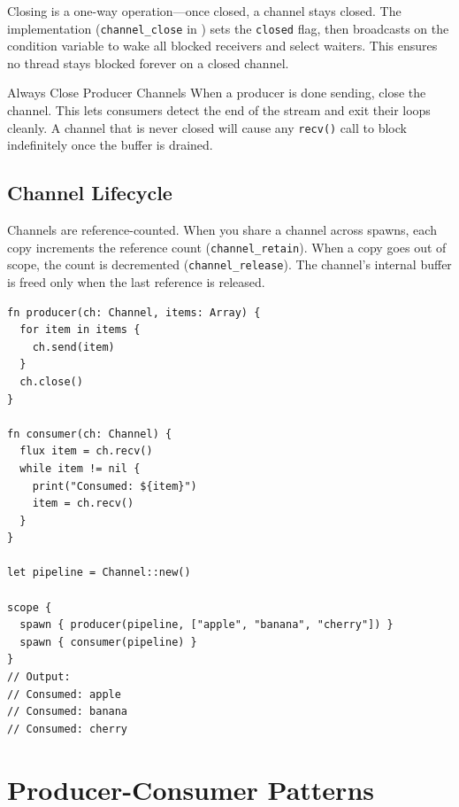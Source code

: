 Closing is a one-way operation---once closed, a channel stays closed.
The implementation (\texttt{channel\_close} in ) sets the \texttt{closed} flag, then broadcasts on the condition variable to wake all blocked receivers and select waiters.
This ensures no thread stays blocked forever on a closed channel.

\begin{tipbox}{Always Close Producer Channels}
When a producer is done sending, close the channel.
This lets consumers detect the end of the stream and exit their loops cleanly.
A channel that is never closed will cause any \lstinline|recv()| call to block indefinitely once the buffer is drained.
\end{tipbox}

\subsection{Channel Lifecycle}

Channels are reference-counted.
When you share a channel across spawns, each copy increments the reference count (\texttt{channel\_retain}).
When a copy goes out of scope, the count is decremented (\texttt{channel\_release}).
The channel's internal buffer is freed only when the last reference is released.

\begin{lstlisting}[language=Lattice, caption={Channel lifecycle across spawns}]
fn producer(ch: Channel, items: Array) {
  for item in items {
    ch.send(item)
  }
  ch.close()
}

fn consumer(ch: Channel) {
  flux item = ch.recv()
  while item != nil {
    print("Consumed: ${item}")
    item = ch.recv()
  }
}

let pipeline = Channel::new()

scope {
  spawn { producer(pipeline, ["apple", "banana", "cherry"]) }
  spawn { consumer(pipeline) }
}
// Output:
// Consumed: apple
// Consumed: banana
// Consumed: cherry
\end{lstlisting}

\section{Producer-Consumer Patterns}\label{sec:producer-consumer}

